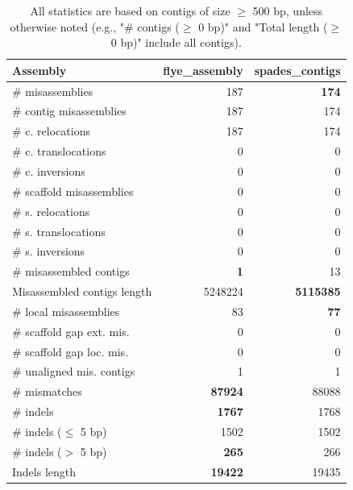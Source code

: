 \documentclass[12pt,a4paper]{article}
\begin{document}
\begin{table}[ht]
\begin{center}
\caption{All statistics are based on contigs of size $\geq$ 500 bp, unless otherwise noted (e.g., "\# contigs ($\geq$ 0 bp)" and "Total length ($\geq$ 0 bp)" include all contigs).}
\begin{tabular}{|l*{2}{|r}|}
\hline
Assembly & flye\_assembly & spades\_contigs \\ \hline
\# misassemblies & 187 & {\bf 174} \\ \hline
\hspace{2mm}\# contig misassemblies & 187 & 174 \\ \hline
\hspace{5mm}\# c. relocations & 187 & 174 \\ \hline
\hspace{5mm}\# c. translocations & 0 & 0 \\ \hline
\hspace{5mm}\# c. inversions & 0 & 0 \\ \hline
\hspace{2mm}\# scaffold misassemblies & 0 & 0 \\ \hline
\hspace{5mm}\# s. relocations & 0 & 0 \\ \hline
\hspace{5mm}\# s. translocations & 0 & 0 \\ \hline
\hspace{5mm}\# s. inversions & 0 & 0 \\ \hline
\# misassembled contigs & {\bf 1} & 13 \\ \hline
Misassembled contigs length & 5248224 & {\bf 5115385} \\ \hline
\# local misassemblies & 83 & {\bf 77} \\ \hline
\# scaffold gap ext. mis. & 0 & 0 \\ \hline
\# scaffold gap loc. mis. & 0 & 0 \\ \hline
\# unaligned mis. contigs & 1 & 1 \\ \hline
\# mismatches & {\bf 87924} & 88088 \\ \hline
\# indels & {\bf 1767} & 1768 \\ \hline
\hspace{5mm}\# indels ($\leq$ 5 bp) & 1502 & 1502 \\ \hline
\hspace{5mm}\# indels ($>$ 5 bp) & {\bf 265} & 266 \\ \hline
Indels length & {\bf 19422} & 19435 \\ \hline
\end{tabular}
\end{center}
\end{table}
\end{document}
